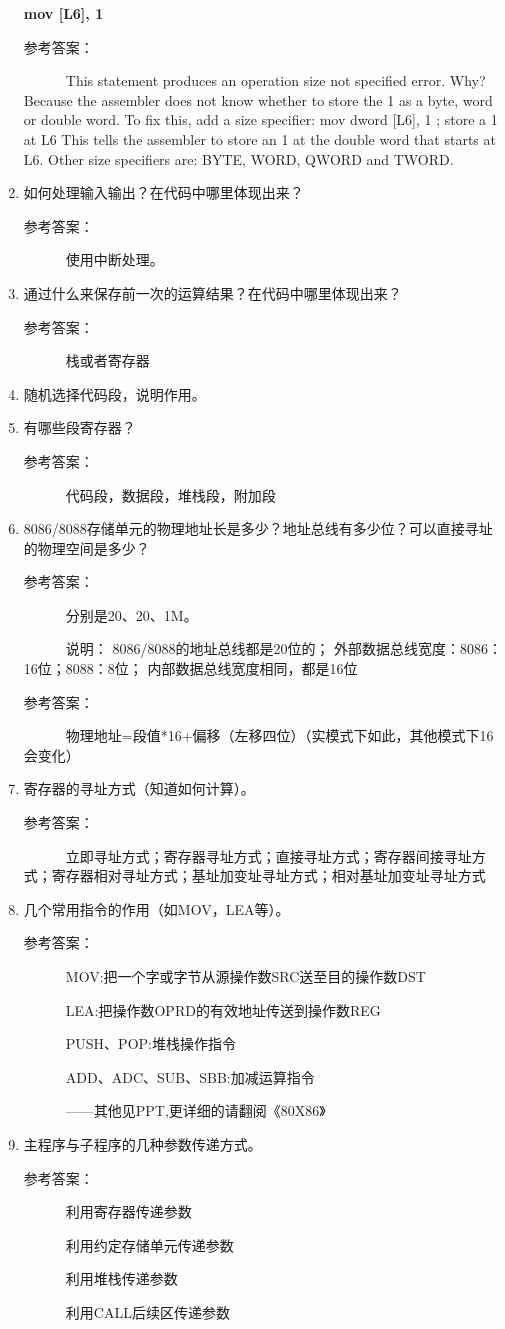 \documentclass[a4paper]{article}
\begin{document}
\begin{enumerate}
		\textbf{mov [L6], 1}
		
		参考答案：
		
		~~~~~~This statement produces an operation size not specified error. Why?
Because the assembler does not know whether to store the 1 as a byte, word
or double word. To fix this, add a size specifier:
mov dword [L6], 1 ; store a 1 at L6
This tells the assembler to store an 1 at the double word that starts at L6.
Other size specifiers are: BYTE, WORD, QWORD and TWORD.
	\item 如何处理输入输出？在代码中哪里体现出来？
	
	参考答案：
	
	~~~~~~使用中断处理。
	\item 通过什么来保存前一次的运算结果？在代码中哪里体现出来？
	
	参考答案：
	
	~~~~~~栈或者寄存器
	\item 随机选择代码段，说明作用。
	\item 有哪些段寄存器？
	
	参考答案：
	
	~~~~~~代码段，数据段，堆栈段，附加段
	\item 8086/8088存储单元的物理地址长是多少？地址总线有多少位？可以直接寻址的物理空间是多少？
	
	参考答案：
	
	~~~~~~分别是20、20、1M。
	
	~~~~~~说明：
8086/8088的地址总线都是20位的；
外部数据总线宽度：8086：16位；8088：8位；
内部数据总线宽度相同，都是16位
	
	参考答案：
	
	~~~~~~物理地址=段值*16+偏移（左移四位）（实模式下如此，其他模式下16会变化）
	\item 寄存器的寻址方式（知道如何计算）。
	
	参考答案：
	
	~~~~~~立即寻址方式；寄存器寻址方式；直接寻址方式；寄存器间接寻址方式；寄存器相对寻址方式；基址加变址寻址方式；相对基址加变址寻址方式
	\item 几个常用指令的作用（如MOV，LEA等）。
	
	参考答案：
	
	~~~~~~MOV:把一个字或字节从源操作数SRC送至目的操作数DST
	
~~~~~~LEA:把操作数OPRD的有效地址传送到操作数REG

~~~~~~PUSH、POP:堆栈操作指令

~~~~~~ADD、ADC、SUB、SBB:加减运算指令

~~~~~~——其他见PPT,更详细的请翻阅《80X86》
	\item 主程序与子程序的几种参数传递方式。
	
	参考答案：
	
	~~~~~~利用寄存器传递参数
	
~~~~~~利用约定存储单元传递参数

~~~~~~利用堆栈传递参数

~~~~~~利用CALL后续区传递参数
	
\end{enumerate}
\end{document}
